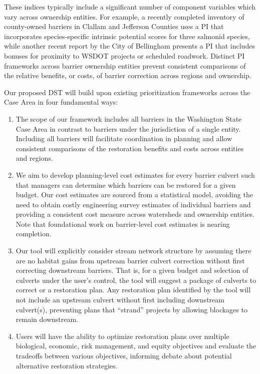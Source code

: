 These indices typically include a significant number of component variables which vary across ownership entities. For example, a recently completed inventory of county-owned barriers in Clallam and Jefferson Counties uses a PI that incorporates species-specific intrinsic potential scores for three salmonid species, while another recent report by the City of Bellingham presents a PI that includes bonuses for proximity to WSDOT projects or scheduled roadwork. Distinct PI frameworks across barrier ownership entities prevent consistent comparisons of the relative benefits, or costs, of barrier correction across regions and ownership. 

Our proposed DST will build upon existing prioritization frameworks across the Case Area in four fundamental ways: 

\begin{enumerate}
\item The scope of our framework includes all barriers in the Washington State Case Area in contrast to barriers under the jurisdiction of a single entity. Including all barriers will facilitate coordination in planning and allow consistent comparisons of the restoration benefits and costs across entities and regions. 
\item We aim to develop planning-level cost estimates for every barrier culvert such that managers can determine which barriers can be restored for a given budget. Our cost estimates are sourced from a statistical model, avoiding the need to obtain costly engineering survey estimates of individual barriers and providing a consistent cost measure across watersheds and ownership entities. Note that foundational work on barrier-level cost estimates is nearing completion.
\item Our tool will explicitly consider stream network structure by assuming there are no habitat gains from upstream barrier culvert correction without first correcting downstream barriers. That is, for a given budget and selection of culverts under the user's control, the tool will suggest a package of culverts to correct or a restoration plan. Any restoration plan identified by the tool will not include an upstream culvert without first including downstream culvert(s), preventing plans that ``strand'' projects by allowing blockages to remain downstream. 
\item Users will have the ability to optimize restoration plans over multiple biological, economic, risk management, and equity objectives and evaluate the tradeoffs between various objectives, informing debate about potential alternative restoration strategies. 
\end{enumerate}

